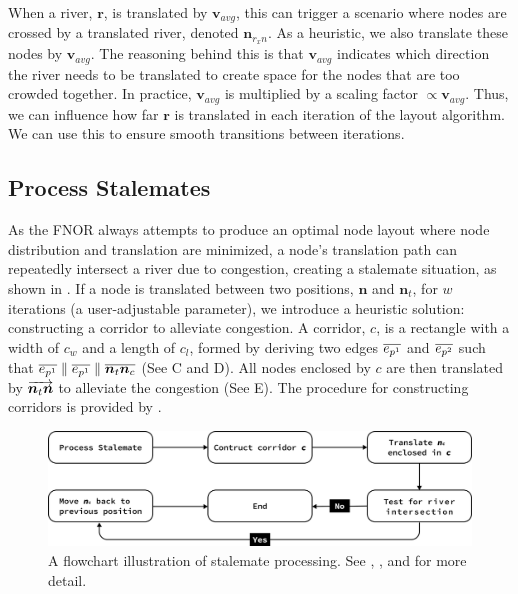 \documentclass[Afour,sagev,times]{sagej}
\newcommand{\Vector}[1]{\protect\overrightarrow{#1}}
\newcommand{\Line}[1]{\protect\overline{#1}}
\newcommand{\stalemateMax}{w}
\newcommand{\node}{\bm{n}}
\newcommand{\nodeFNOR}{\node_t}
\newcommand{\nodeVectorTC}{\Vector{\nodeFNOR\node}}
\newcommand{\river}{\bm{r}}
\newcommand{\Corridor}{c}
\newcommand{\CorridorLength}{\Corridor_l}
\newcommand{\CorridorWidth}{\Corridor_w}
\newcommand{\PointP}{\node_c}
\newcommand{\EdgeParallelA}{\Line{e_{p^1}}}
\newcommand{\EdgeParallelB}{\Line{e_{p^2}}}
\newcommand{\nodeLineNtNc}{\Line{\nodeFNOR\PointP}}
\newcommand{\vectorAvg}{\bm{v}_{avg}}
\newcommand{\RxN}{\node_{r_{x}n}}
\begin{document}
When a river, $ \river $, is translated by $ \vectorAvg $, this can trigger a scenario where nodes are crossed by a translated river, denoted $ \RxN $. As a heuristic, we also translate these nodes by $ \vectorAvg $. The reasoning behind this is that $ \vectorAvg $ indicates which direction the river needs to be translated to create space for the nodes that are too crowded together. In practice, $ \vectorAvg $ is multiplied by a scaling factor $ \propto\vectorAvg $. Thus, we can influence how far $ \river $ is translated in each iteration of the layout algorithm. We can use this to ensure smooth transitions between iterations.

\subsection{Process Stalemates}
\label{subsec:{Process Stalemates}}

As the FNOR always attempts to produce an optimal node layout where node distribution and translation are minimized, a node's translation path can repeatedly intersect a river due to congestion, creating a stalemate situation, as shown in . If a node is translated between two positions, $ \node $ and $ \nodeFNOR $, for $ \stalemateMax $ iterations (a user-adjustable parameter), we introduce a heuristic solution: constructing a corridor to alleviate congestion. A corridor, $ \Corridor $, is a rectangle with a width of $ \CorridorWidth $ and a length of $ \CorridorLength $, formed by deriving two edges $ \EdgeParallelA $ and $ \EdgeParallelB $ such that $ \EdgeParallelA \parallel \EdgeParallelA \parallel \nodeLineNtNc $ (See C and D). All nodes enclosed by $ \Corridor $ are then translated by $ \nodeVectorTC $ to alleviate the congestion (See E). The procedure for constructing corridors is provided by .

{
    \begin{figure}[tb!]
        \centering
        \includegraphics[width=\columnwidth,keepaspectratio]{flowchart stalemate.png}
        \caption{A flowchart illustration of stalemate processing. See , , and  for more detail.}
        \label{fig:flowchart-stalemate}
    \end{figure}
   }
\end{document}
